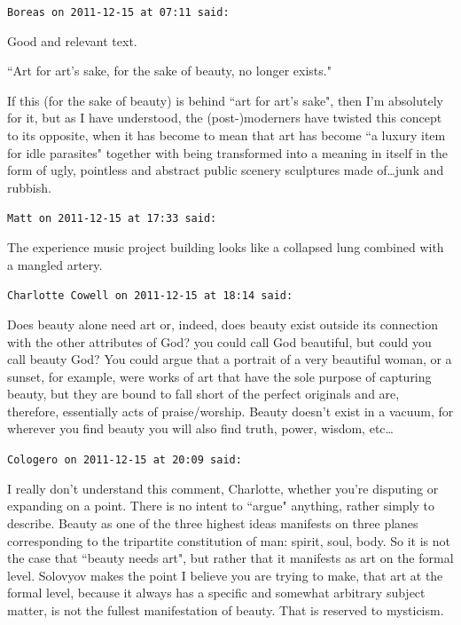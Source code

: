 \begin{footnotesize}
\begin{sffamily}
\hfill

\texttt{Boreas on 2011-12-15 at 07:11 said: }

Good and relevant text.

``Art for art's sake, for the sake of beauty, no longer exists."

If this (for the sake of beauty) is behind ``art for art's sake", then I'm absolutely for it, but as I have understood, the (post-)moderners have twisted this concept to its opposite, when it has become to mean that art has become ``a luxury item for idle parasites" together with being transformed into a meaning in itself in the form of ugly, pointless and abstract public scenery sculptures made of…junk and rubbish.


\hfill

\texttt{Matt on 2011-12-15 at 17:33 said: }

The experience music project building looks like a collapsed lung combined with a mangled artery.


\hfill

\texttt{Charlotte Cowell on 2011-12-15 at 18:14 said: }

Does beauty alone need art or, indeed, does beauty exist outside its connection with the other attributes of God? you could call God beautiful, but could you call beauty God? You could argue that a portrait of a very beautiful woman, or a sunset, for example, were works of art that have the sole purpose of capturing beauty, but they are bound to fall short of the perfect originals and are, therefore, essentially acts of praise/worship. Beauty doesn't exist in a vacuum, for wherever you find beauty you will also find truth, power, wisdom, etc…


\hfill

\texttt{Cologero on 2011-12-15 at 20:09 said: }

I really don't understand this comment, Charlotte, whether you're disputing or expanding on a point. There is no intent to ``argue" anything, rather simply to describe. Beauty as one of the three highest ideas manifests on three planes corresponding to the tripartite constitution of man: spirit, soul, body. So it is not the case that ``beauty needs art", but rather that it manifests as art on the formal level. Solovyov makes the point I believe you are trying to make, that art at the formal level, because it always has a specific and somewhat arbitrary subject matter, is not the fullest manifestation of beauty. That is reserved to mysticism.


\end{sffamily}
\end{footnotesize}
